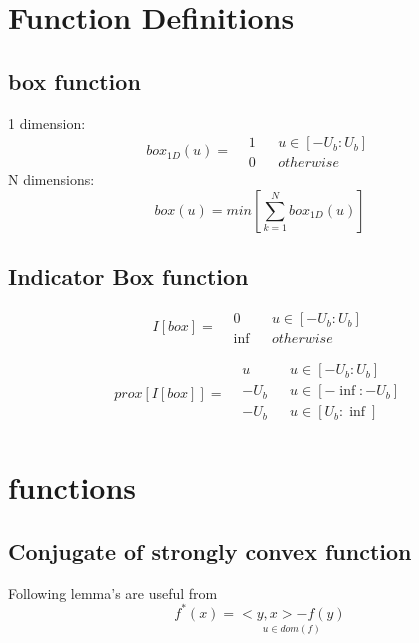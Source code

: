 \section{Function Definitions}
	\subsection{box function}
		1 dimension:
		\begin{equation}
			box_{1D}(u) =
			\begin{aligned}
			 & 1 && u \in [-U_b:U_b]\\
			 & 0 && otherwise
			\end{aligned}
			\label{eq:box function 1 dimension}
		\end{equation}
		N dimensions:
		\begin{equation}
		box(u) = min\left[ \sum_{k=1}^ N box_{1D}(u) \right]
		\label{eq:box function N dimensions}
		\end{equation}
	\subsection{Indicator Box function}
		\begin{equation}
			I[box]=
			\begin{aligned}
			& 0 && u \in [-U_b:U_b]\\
			& \inf && otherwise
			\end{aligned}
		\end{equation}
		
		\begin{equation}
		prox[I[box]]=
		\begin{aligned}
		& u && u \in [-U_b:U_b]\\
		& -U_b && u \in [-\inf:-U_b]\\
		& -U_b && u \in [U_b:\inf]\\
		\end{aligned}
		\end{equation}
\section{functions}

	\subsection{Conjugate of strongly convex function}
		Following lemma's are useful from 
		\begin{equation}
			f^*(x)= \underset{u \in dom(f)}{<y,x>-f(y)}
		\end{equation}
		
